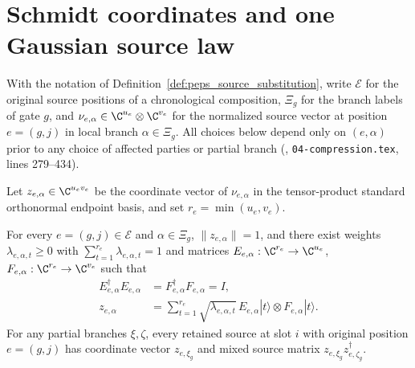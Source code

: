 \section{Schmidt coordinates and one Gaussian source law}

With the notation of Definition~\ref{def:peps_source_substitution}, write $\mathcal E$ for the original source positions of a chronological composition, $\Xi_g$ for the branch labels of gate $g$, and $\nu_{e,\alpha}\in\C^{u_e}\otimes\C^{v_e}$ for the normalized source vector at position $e=(g,j)$ in local branch $\alpha\in\Xi_g$. All choices below depend only on $(e,\alpha)$ prior to any choice of affected parties or partial branch (\cite[proof of Theorem~5.2]{OpenAI2026PolynomialPEPS}, \texttt{04-compression.tex}, lines 279--434).

\begin{definition}
    \label{def:peps_source_coordinates}
    \leanok
    Let $z_{e,\alpha}\in\C^{u_ev_e}$ be the coordinate vector of
    $\nu_{e,\alpha}$ in the tensor-product standard orthonormal endpoint basis, and set $r_e=\min(u_e,v_e)$.
\end{definition}

\begin{lemma}
    \label{thm:peps_local_schmidt_sources}
    \leanok
    For every $e=(g,j)\in\mathcal E$ and $\alpha\in\Xi_g$, $\|z_{e,\alpha}\|=1$, and there exist weights $\lambda_{e,\alpha,t}\geq0$ with $\sum_{t=1}^{r_e}\lambda_{e,\alpha,t}=1$ and matrices $E_{e,\alpha}:\C^{r_e}\to\C^{u_e}$, $F_{e,\alpha}:\C^{r_e}\to\C^{v_e}$ such that
    \begin{align}
        E_{e,\alpha}^{\dagger}E_{e,\alpha}
         & =F_{e,\alpha}^{\dagger}F_{e,\alpha}=I,         \\
        z_{e,\alpha}
         & =\sum_{t=1}^{r_e}\sqrt{\lambda_{e,\alpha,t}}\,
        E_{e,\alpha}|t\rangle\otimes F_{e,\alpha}|t\rangle.
        \label{eq:peps_local_schmidt_source}
    \end{align}
    For any partial branches $\xi,\zeta$, every retained source at slot $i$ with original position $e=(g,j)$ has coordinate vector $z_{e,\xi_g}$ and mixed source matrix $z_{e,\xi_g}z_{e,\zeta_g}^{\dagger}$.
\end{lemma}

